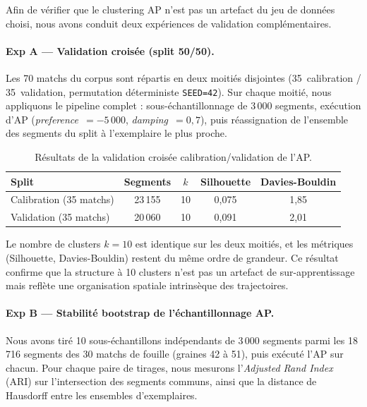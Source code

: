 \documentclass[11pt, a4paper]{article}
\begin{document}
Afin de vérifier que le clustering AP n'est pas un artefact du jeu de données choisi, nous avons conduit deux expériences de validation complémentaires.

\paragraph{Exp A --- Validation croisée (split 50/50).}
Les 70 matchs du corpus sont répartis en deux moitiés disjointes (35~calibration / 35~validation, permutation déterministe \texttt{SEED=42}). Sur chaque moitié, nous appliquons le pipeline complet : sous-échantillonnage de 3\,000 segments, exécution d'AP (\textit{preference}~$=-5\,000$, \textit{damping}~$=0{,}7$), puis réassignation de l'ensemble des segments du split à l'exemplaire le plus proche.

\begin{table}[H]
\centering
\begin{tabular}{lcccc}
\hline
\textbf{Split} & \textbf{Segments} & $k$ & \textbf{Silhouette} & \textbf{Davies-Bouldin} \\
\hline
Calibration (35 matchs) & 23\,155 & 10 & 0{,}075 & 1{,}85 \\
Validation (35 matchs) & 20\,060 & 10 & 0{,}091 & 2{,}01 \\
\hline
\end{tabular}
\caption{Résultats de la validation croisée calibration/validation de l'AP.}
\label{tab:cv_results}
\end{table}

Le nombre de clusters $k=10$ est identique sur les deux moitiés, et les métriques (Silhouette, Davies-Bouldin) restent du même ordre de grandeur. Ce résultat confirme que la structure à 10 clusters n'est pas un artefact de sur-apprentissage mais reflète une organisation spatiale intrinsèque des trajectoires.

\paragraph{Exp B --- Stabilité bootstrap de l'échantillonnage AP.}
Nous avons tiré 10 sous-échantillons indépendants de 3\,000 segments parmi les 18\,716 segments des 30 matchs de fouille (graines 42 à 51), puis exécuté l'AP sur chacun. Pour chaque paire de tirages, nous mesurons l'\textit{Adjusted Rand Index} (ARI) sur l'intersection des segments communs, ainsi que la distance de Hausdorff entre les ensembles d'exemplaires.
\end{document}
